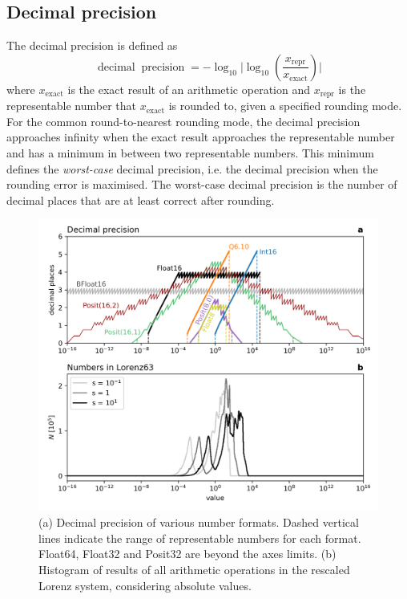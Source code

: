 \documentclass[draft]{agujournal2019}
\newcommand{\op}{\operatorname}
\begin{document}
\subsection{Decimal precision}
\label{sec:decprec}

The decimal precision is defined as \cite{Gustafson2017,Gustafson2017b}
\begin{equation}
\op{decimal} \op{precision} = -\log_{10} \vert \log_{10}( \frac{x_\text{repr}}{x_\text{exact}} ) \vert
\end{equation}
where $x_\text{exact}$ is the exact result of an arithmetic operation and $x_\text{repr}$ is the representable number that $x_\text{exact}$ is rounded to, given a specified rounding mode. For the common round-to-nearest rounding mode, the decimal precision approaches infinity when the exact result approaches the representable number and has a minimum in between two representable numbers. This minimum defines the \emph{worst-case} decimal precision, i.e. the decimal precision when the rounding error is maximised. The worst-case decimal precision is the number of decimal places that are at least correct after rounding. 

\begin{figure}[htbp]
\includegraphics[width=1\textwidth]{../plots/decimal_precision.png}
\caption{(a) Decimal precision of various number formats. Dashed vertical lines indicate the range of representable numbers for each format. Float64, Float32 and Posit32 are beyond the axes limits. (b) Histogram of results of all arithmetic operations in the rescaled Lorenz system, considering absolute values.}
\label{fig:dec_acc}
\end{figure}
\end{document}
